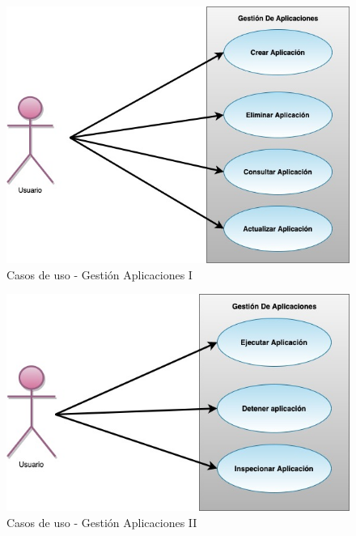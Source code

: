 \documentclass[a4paper,11pt]{book}
\begin{document}
~\\
~\\
~\\
~\\
~\\
~\\
\begin{figure}[H]
\centering
\includegraphics[scale=0.50]{imagenes/casosUso1.jpg}
\caption{ Casos de uso - Gestión Aplicaciones I~\cite{diagrama}  }
\label{c1}
\end{figure}

\begin{figure}[H]
\centering
\includegraphics[scale=0.50]{imagenes/casosUso2.jpg}
\caption{ Casos de uso - Gestión Aplicaciones II~\cite{diagrama}  }
\label{c2}
\end{figure}
\end{document}
